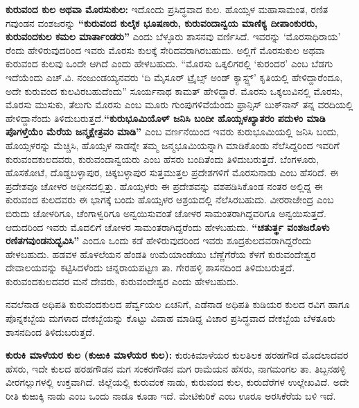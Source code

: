 \textbf{ಕುರುವಂದ ಕುಲ ಅಥವಾ ಮೊರಸುಕುಲ:} ಇದೊಂದು ಪ್ರಸಿದ್ಧವಾದ ಕುಲ. ಹೊಯ್ಸಳ ಮಹಾಸಾಮಂತ, ರಣಿತ ಗವುಂಡನ ವಂಶಜರನ್ನು \textbf{“ಕುರುವಂದ ಕುಲೈಕ ಭೂಷಣರು, ಕುರುವಂದಾನ್ವಯ ಮಾಣಿಕ್ಯ ದೀಪಾಂಕುರರು, ಕುರುವಂದಕುಲ ಕಮಲ ಮಾರ್ತಾಂಡರು”} ಎಂದು ಬೆಳ್ಳೂರು ಶಾಸನವು ವರ್ಣಿಸಿದೆ. ಇವರನ್ನು ‘ಮೊರಸಾಧಿರಾಯ’ ರೆಂದು ಹೇಳಿರುವುದರಿಂದ ಇವರು ಮೊರಸು ಕುಲಕ್ಕೆ ಸೇರಿದವರಾಗಿರಬಹುದು. ಅಲ್ಲಿಗೆ ಮೊರಸುಕುಲ ಅಥವಾ ಕುರುವಂದ ಕುಲವು ಒಂದೇ ಆಗಿದೆ ಎಂದು ಹೇಳಬಹುದು. “ಮೊರಸು ಒಕ್ಕಲಿಗರಲ್ಲಿ ‘ಕುರಂದರ’ ಎಂಬ ಬೆಡಗು ಇದೆಯೆಂದು ಎಚ್​.ವಿ. ನಂಜುಂಡಯ್ಯನವರು ‘ದಿ ಮೈಸೂರ್​ ಟ್ರೈಬ್ಸ್​ ಅಂಡ್​ ಕ್ಯಾಸ್ಟ್ಸ್’ ಕೃತಿಯಲ್ಲಿ ಹೇಳಿದ್ದಾರೆಂದೂ, ಅದೇ ಕುರುವಂದ ಕುಲವಿರಬಹುದೆಂದು” ಸೂರ್ಯನಾಥ ಕಾಮತ್​ ಹೇಳಿದ್ದಾರೆ. ಮೊರಸು ಒಕ್ಕಲುವಿನಲ್ಲಿ ಮೊರಸು, ಮೊರಸು ಮುಸುಕು, ತೆಲುಗು ಮೊರಸು ಎಂಬ ಮೂರು ಗುಂಪುಗಳಿವೆಯೆಂದು ಫ್ರಾನ್ಸಿಸ್​ ಬುಕ್​ನಾನ್​ ತನ್ನ ವರದಿಯಲ್ಲಿ ಹೇಳಿದ್ದಾನೆಂದು ತಿಳಿದುಬರುತ್ತದೆ.\textbf{“ಕುರುಭೂಮಿಯೊಳ್​ ಜನಿಸಿ ಬಂದೀ ಹೊಯ್ಸಳಖ್ಯಾತರಂ ಪದುಳಂ ಮಾಡಿ ಪೊಗಳ್ತೆಯೆಂ ಮೆರೆಯ ಜನ್ಮಕ್ಷೇತ್ರವಂ ಮಾಡಿ”} ಎಂಬ ವರ್ಣನೆಯಿಂದ ಇವರು ಕುರುಭೂಮಿಯಲ್ಲಿ ಜನಿಸಿ ಬಂದು, ಹೊಯ್ಸಳರನ್ನು ಮೆಚ್ಚಿಸಿ, ಹೊಯ್ಸಳ ನಾಡನ್ನೇ ತಮ್ಮ ಜನ್ಮಭೂಮಿಯನ್ನಾಗಿ ಮಾಡಿಕೊಂಡು ನೆಲೆಸಿದ್ದರಿಂದ ಇವರಿಗೆ ಕುರುವಂದಕುಲದವರು, ಕುರುವಂದಾನ್ವಯರು ಎಂಬ ಹೆಸರು ಬಂದಿತೆಂದು ತಿಳಿದುಬರುತ್ತದೆ. ಬೆಂಗಳೂರು, ಹೊಸಕೋಟೆ, ದೊಡ್ಡಬಳ್ಳಾಪುರ, ಚಿಕ್ಕಬಳ್ಳಾಪುರ ಸುತ್ತಮುತ್ತಲ ಪ್ರದೇಶಗಳಿಗೆ ಮೊರಸುನಾಡು ಎಂಬ ಹೆಸರಿದೆ. ಈ ಪ್ರದೇಶವೂ ಚೋಳರ ಅಧೀನದಲ್ಲಿತ್ತು. ಹೊಯ್ಸಳರು ಈ ಪ್ರದೇಶವನ್ನು ವಶಪಡಿಸಿಕೊಂಡ ನಂತರ ಅಲ್ಲಿದ್ದ ಈ ಕುರುವಂದ ಕುಲದವರು ಈ ಭಾಗಕ್ಕೆ ಬಂದು ಹೊಯ್ಸಳರ ಆಶ್ರಯದಲ್ಲಿ ನೆಲೆಸಿರಬಹುದು. ವೀರರಾಜೇಂದ್ರ ಎಂಬ ಬಿರುದು ಚೋಳರಿಗೂ, ಚೆಂಗಾಳ್ವರಿಗೂ ಅನ್ವಯಿಸುವಂತೆ ಚೋಳರ ಸಾಮಂತರಾಗಿದ್ದವರಿಗೂ ಅನ್ವಯಿಸುತ್ತದೆ. ಆದುದರಿಂದ ಇವರು ಮೊದಲಿಗೆ ಚೋಳರ ಸಾಮಂತರಾಗಿದ್ದರೆಂದು ಹೇಳಬಹುದು. \textbf{“ಚತುರ್ತ್ಥ ವಂಶಜರೊಳು ರಣಿತಗವುಂಡನುದ್ಭವಿಸಿ”} ಎಂದೂ ಒಂದು ಕಡೆ ಹೇಳಿರುವುದರಿಂದ ಇವರು ಶೂದ್ರಕುಲದವರಾಗಿದ್ದರೆಂದು ಹೇಳಬಹುದು. ಹಡವಳ ಹೊಳಲೆಯನ ಹೆಂಡತಿ ಉಮೆಯಾಂಡೆಯು ಬೆಣ್ಣೆಗೆರೆಯ ಕೆಳಗೆ ಕುರುವಂದೇಶ್ವರ ದೇವಾಲಯವನ್ನು ಕಟ್ಟಿಸಿದಳೆಂದು ಚನ್ನರಾಯಪಟ್ಟಣ ತಾ. ಗೇರಹಳ್ಳಿ ಶಾಸನದಿಂದ ತಿಳಿದುಬರುತ್ತದೆ. ಕುರುವಂದಕುಲದವರ ಮನೆ ದೇವರು, ಕುರುವಂದೇಶ್ವರ ಎಂದು ಹೇಳಬಹುದು.

ನವಲೆನಾಡ ಅಧಿಪತಿ ಕುರುವಂದಕುಲದ ಪೆರ್ವ್ವಯಲ ಏಚನಿಗೆ, ಎಡೆನಾಡ ಅಧಿಪತಿ ಕುಡಿಯರ ಕುಲದ ರವಿಗ ಹಾಗೂ ಪೊನ್ನಕಬ್ಬೆಯ ಮಗಳಾದ ದೇಕಬ್ಬೆಯನ್ನು ಕೊಟ್ಟು ವಿವಾಹ ಮಾಡಿದ್ದ ವಿಚಾರ ಪ್ರಸಿದ್ಧವಾದ ದೇಕಬ್ಬೆಯ ಬೆಳತೂರು ಶಾಸನದಿಂದ ತಿಳಿದುಬರುತ್ತದೆ.

\textbf{ಕುರುಕಿ ಮಾಳೆಯರ ಕುಲ (ಕುಱುಕಿ ಮಾಳೆಯರ ಕುಲ):} ಕುರುಕಿಮಾಳೆಯರ ಕುಲತಿಲಕ ಹರಹಗೌಡ ಮೊದಲಾದವರ ಹೆಸರು, ಇದೇ ಕುಲದ ಹರಹಗೌಡನ ಮಗ ಸಂಕರಗೌಡನ ಮಗ ರಾಮೆಯನ ಹೆಸರು, ನಾಗಮಂಗಲ ತಾ. ತಿಬ್ಬನಹಳ್ಳಿ ವೀರಗಲ್ಲುಗಳಲ್ಲಿ ಉಕ್ತವಾಗಿದೆ. ಜಿಲ್ಲೆಯಲ್ಲಿ ಕುರುವಂಕ ನಾಡು, ಕುರುವಂದ ಕುಲ, ಕುರುದೆರೆಗಳ ಉಲ್ಲೇಖವಿದೆ. ಅದೇ ರೀತಿ ಕುಱುಕ್ಕಿ ನಾಡು ಎಂಬ ಒಂದು ನಾಡೂ ಕೂಡಾ ಇದೆ. ಮೇಟಿಕುರಿಕೆ ಎಂಬ ಊರೂ ಅರಸಿಕೆರೆಯ ಬಳಿ ಇದೆ.

